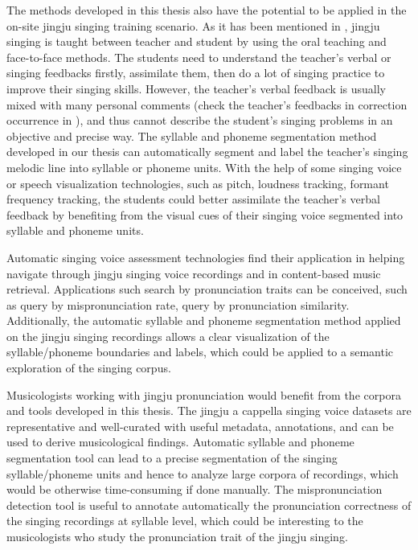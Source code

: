 The methods developed in this thesis also have the potential to be applied in the on-site jingju singing training scenario. As it has been mentioned in , jingju singing is taught between teacher and student by using the oral teaching and face-to-face methods. The students need to understand the teacher's verbal or singing feedbacks firstly, assimilate them, then do a lot of singing practice to improve their singing skills. However, the teacher's verbal feedback is usually mixed with many personal comments (check the teacher's feedbacks in correction occurrence in ), and thus cannot describe the student's singing problems in an objective and precise way. The syllable and phoneme segmentation method developed in our thesis can automatically segment and label the teacher's singing melodic line into syllable or phoneme units. With the help of some singing voice or speech visualization technologies, such as pitch, loudness tracking, formant frequency tracking, the students could better assimilate the teacher's verbal feedback by benefiting from the visual cues of their singing voice segmented into syllable and phoneme units.

Automatic singing voice assessment technologies find their application in helping navigate through jingju singing voice recordings and in content-based music retrieval. Applications such search by pronunciation traits can be conceived, such as query by mispronunciation rate, query by pronunciation similarity. Additionally, the automatic syllable and phoneme segmentation method applied on the jingju singing recordings allows a clear visualization of the syllable/phoneme boundaries and labels, which could be applied to a semantic exploration of the singing corpus.

Musicologists working with jingju pronunciation would benefit from the corpora and tools developed in this thesis. The jingju a cappella singing voice datasets are representative and well-curated with useful metadata, annotations, and can be used to derive musicological findings. Automatic syllable and phoneme segmentation tool can lead to a precise segmentation of the singing syllable/phoneme units and hence to analyze large corpora of recordings, which would be otherwise time-consuming if done manually. The mispronunciation detection tool is useful to annotate automatically the pronunciation correctness of the singing recordings at syllable level, which could be interesting to the musicologists who study the pronunciation trait of the jingju singing.

